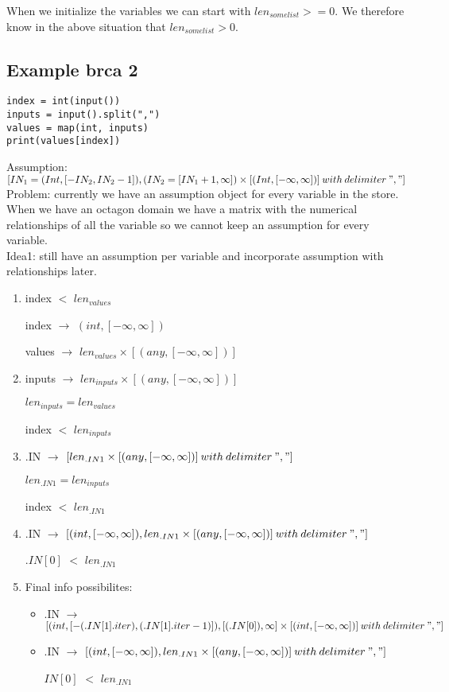 \documentclass[11pt]{article}
\begin{document}
When we initialize the variables we can start with $len_{somelist} >= 0$. We therefore know in the above situation that $len_{somelist} > 0$.


\subsection{Example brca 2}
\begin{lstlisting}
index = int(input())
inputs = input().split(",")
values = map(int, inputs)
print(values[index])
\end{lstlisting}


Assumption: $[IN_1 = (Int, [-IN_2, IN_2-1]), (IN_2 = [IN_1+1, \infty]) \times [(Int, [-\infty, \infty])]\:with\:delimiter\:","]$\\


Problem: currently we have an assumption object for every variable in the store. When we have an octagon domain we have a matrix with the numerical relationships of all the variable so we cannot keep an assumption for every variable.\\
Idea1: still have an assumption per variable and incorporate assumption with relationships later.

\begin{enumerate}
  \item index $<$ $len_{values}$

  index $\rightarrow$ $(int, [-\infty, \infty])$

  values $\rightarrow$ $len_{values}\times[(any, [-\infty, \infty])]$

  \item inputs $\rightarrow$ $len_{inputs}\times[(any, [-\infty, \infty])]$

  $len_{inputs} = len_{values}$

  index $<$ $len_{inputs}$

  \item .IN $\rightarrow$ $[len_{.IN1}\times[(any, [-\infty, \infty])]\:with\:delimiter\:","]$

  $len_{.IN1} = len_{inputs}$

  index $<$ $len_{.IN1}$

  \item .IN $\rightarrow$ $[(int, [-\infty, \infty]), len_{.IN1}\times[(any, [-\infty, \infty])]\:with\:delimiter\:","]$

  $.IN[0]$ $<$ $len_{.IN1}$

  \item Final info possibilites:

  \begin{itemize}
    \item .IN $\rightarrow$ $[(int, [-(.IN[1].iter), (.IN[1].iter-1)]), [(.IN[0]), \infty]\times[(int, [-\infty, \infty])]\:with\:delimiter\:","]$
    
    \item .IN $\rightarrow$ $[(int, [-\infty, \infty]), len_{.IN1}\times[(any, [-\infty, \infty])]\:with\:delimiter\:","]$
    
    $IN[0]$ $<$ $len_{.IN1}$
  \end{itemize}
  
\end{enumerate}
\end{document}
